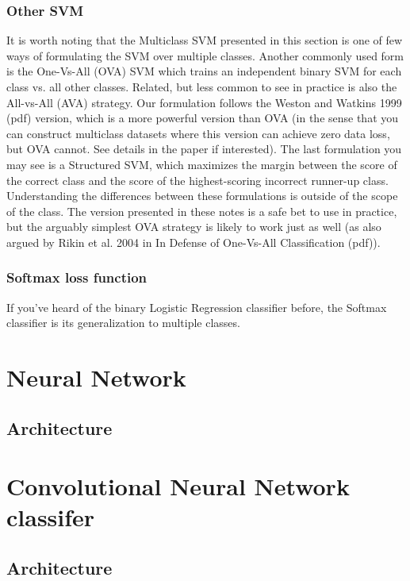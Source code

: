 \documentclass[10pt,a4paper]{article}
\begin{document}
\subsubsection{Other SVM}
It is worth noting that the Multiclass SVM presented in this section is one of few ways of formulating the SVM over multiple classes.
Another commonly used form is the One-Vs-All (OVA) SVM which trains an independent binary SVM for each class vs. all other classes.
Related, but less common to see in practice is also the All-vs-All (AVA) strategy.
Our formulation follows the Weston and Watkins 1999 (pdf) version, which is a more powerful version than OVA (in the sense that you can construct multiclass datasets where this version can achieve zero data loss, but OVA cannot.
See details in the paper if interested).
The last formulation you may see is a Structured SVM, which maximizes the margin between the score of the correct class and the score of the highest-scoring incorrect runner-up class.
Understanding the differences between these formulations is outside of the scope of the class.
The version presented in these notes is a safe bet to use in practice, but the arguably simplest OVA strategy is likely to work just as well (as also argued by Rikin et al. 2004 in In Defense of One-Vs-All Classification (pdf)).



\subsubsection{Softmax loss function}
If you’ve heard of the binary Logistic Regression classifier before, the Softmax classifier is its generalization to multiple classes.



\section{Neural Network}

\subsection{Architecture}



\section{Convolutional Neural Network classifer}

\subsection{Architecture}
\end{document}
